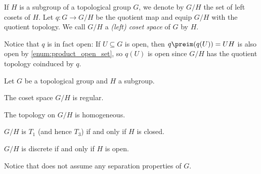 \documentclass[article, a4paper, 11pt, oneside]{memoir}
\numberwithin{equation}{chapter}
\begin{document}
If $H$ is a subgroup of a topological group $G$, we denote by $G/H$ the set of left cosets of $H$. Let $q \colon G \to G/H$ be the quotient map and equip $G/H$ with the quotient topology. We call $G/H$ a \emph{(left) coset space} of $G$ by $H$.

Notice that $q$ is in fact open: If $U \subseteq G$ is open, then $q\preim(q(U)) = UH$ is also open by \cref{enum:product_open_set}, so $q(U)$ is open since $G/H$ has the quotient topology coinduced by $q$.


\begin{proposition}
    Let $G$ be a topological group and $H$ a subgroup.
    \begin{enumprop}
        \item \label{enum:coset_space_regular} The coset space $G/H$ is regular.

        \item \label{enum:coset-space-homogeneous} The topology on $G/H$ is homogeneous.
        
        \item \label{enum:coset_space_T1} $G/H$ is $T_1$ (and hence $T_3$) if and only if $H$ is closed.

        \item \label{enum:coset-space-discrete} $G/H$ is discrete if and only if $H$ is open.
    \end{enumprop}
\end{proposition}
%
Notice that  does not assume any separation properties of $G$.

\end{document}
